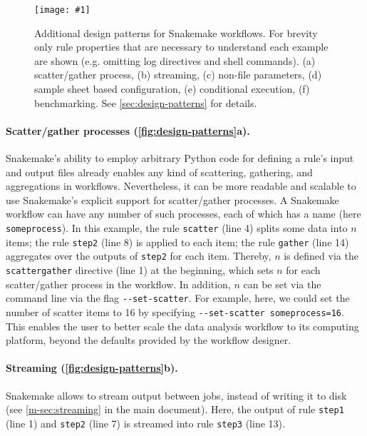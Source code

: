 \documentclass{scrartcl}
\newcommand{\image}[1]{\centering\texttt{[image: \#1]}}
\begin{document}
\begin{figure}
	\image{design-patterns.pdf}
	\caption{Additional design patterns for Snakemake workflows.
		For brevity only rule properties that are necessary to understand each example are shown (e.g. omitting log directives and shell commands).
		(a) scatter/gather process, (b) streaming, (c) non-file parameters, (d) sample sheet based configuration, (e) conditional execution, (f) benchmarking.
		See \autoref{sec:design-patterns} for details.
	}\label{fig:design-patterns}
\end{figure}

\paragraph{Scatter/gather processes (\autoref{fig:design-patterns}a).}
Snakemake's ability to employ arbitrary Python code for defining a rule's input and output files already enables any kind of scattering, gathering, and aggregations in workflows.
Nevertheless, it can be more readable and scalable to use Snakemake's explicit support for scatter/gather processes.
A Snakemake workflow can have any number of such processes, each of which has a name (here \lstinline!someprocess!).
In this example, the rule \lstinline!scatter! (line 4) splits some data into $n$ items; the rule \lstinline!step2! (line 8) is applied to each item; the rule \lstinline!gather! (line 14) aggregates over the outputs of \lstinline!step2! for each item.
Thereby, $n$ is defined via the \lstinline!scattergather! directive (line 1) at the beginning, which sets $n$ for each scatter/gather process in the workflow.
In addition, $n$ can be set via the command line via the flag \lstinline!--set-scatter!.
For example, here, we could set the number of scatter items to 16 by specifying \lstinline!--set-scatter someprocess=16!.
This enables the user to better scale the data analysis workflow to its computing platform, beyond the defaults provided by the workflow designer.

\paragraph{Streaming (\autoref{fig:design-patterns}b).}
Snakemake allows to stream output between jobs, instead of writing it to disk (see \autoref{m-sec:streaming} in the main document).
Here, the output of rule \lstinline!step1! (line 1) and \lstinline!step2! (line 7) is streamed into rule \lstinline!step3! (line 13).
\end{document}
